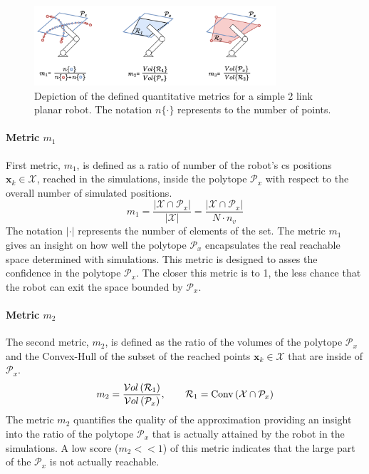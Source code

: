 \begin{figure}[!h]
    \centering
    \includegraphics[width=0.8\textwidth]{Papers/images/metrics.pdf}
    \caption{Depiction of the defined quantitative metrics for a simple 2 link planar robot. The notation $n\{\cdot\}$ represents to the number of points.}
    \label{fig:metrics_defintition}
\end{figure}

\paragraph*{Metric $m_1$} First metric, $m_1$, is defined as a ratio of number of the robot's \gls{cs} positions $\bm{x}_k\in \mathcal{X}$, reached in the simulations, inside the polytope $\mathcal{P}_x$ with respect to the overall number of simulated positions. 
\begin{equation}
    m_1 = \frac{|\mathcal{X}\cap\mathcal{P}_x|}{|\mathcal{X}|} = \frac{|\mathcal{X}\cap\mathcal{P}_x|}{N\cdot n_v}
\end{equation}
The notation $|\cdot|$ represents the number of elements of the set. The metric $m_1$ gives an insight on how well the polytope $\mathcal{P}_x$ encapsulates the real reachable space determined with simulations. This metric is designed to asses the confidence in the polytope $\mathcal{P}_x$. The closer this metric is to 1, the less chance that the robot can exit the space bounded by $\mathcal{P}_x$.

\paragraph*{Metric $m_2$}  The second metric, $m_2$, is defined as the ratio of the volumes of the polytope $\mathcal{P}_x$ and the Convex-Hull of the subset of the reached points $\bm{x}_k\in\mathcal{X}$ that are inside of $\mathcal{P}_x$.
\begin{equation}
    m_2 = \frac{\mathcal{V}ol\left( \mathcal{R}_1\right)}{\mathcal{V}ol\left(\mathcal{P}_x\right)},\qquad  \mathcal{R}_1 = \text{Conv}\left(\mathcal{X}\cap\mathcal{P}_x\right)
\end{equation}
The metric $m_2$ quantifies the quality of the approximation providing an insight into the ratio of the polytope $\mathcal{P}_x$ that is actually attained by the robot in the simulations. A low score ($m_2 << 1$) of this metric indicates that the large part of the $\mathcal{P}_x$ is not actually reachable.

